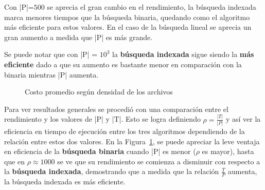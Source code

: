 \documentclass[11pt]{article}
\begin{document}
Con |P|=$500$ se aprecia el gran cambio en el rendimiento, la búsqueda indexada marca menores tiempos que la búsqueda binaria, quedando como el algoritmo más eficiente para estos valores. En el caso de la búsqueda lineal se aprecia un gran aumento a medida que |P| es más grande.

Se puede notar que con |P| = $10^3$ la \textbf{búsqueda indexada} sigue siendo la \textbf{más eficiente} dado a que su aumento es bastante menor en comparación con la binaria mientras |P| aumenta.



\newpage

\begin{figure}[h!]
        \centering
        \caption{Costo promedio según densidad de los archivos}
        \label{fig:densidad}
    \end{figure}
    
Para ver resultados generales se procedió con una comparación entre el rendimiento y los valores de |P| y |T|. Esto se logra definiendo $\rho = \frac{|T|}{|P|}$ y así ver la eficiencia en tiempo de ejecución entre los tres algoritmos dependiendo de la relación entre estos dos valores. En la Figura~\ref{fig:densidad}, se puede apreciar la leve ventaja en eficiencia de la \textbf{búsqueda binaria} cuando |P| es menor ($\rho$ es mayor), hasta que en $\rho \approx 1000$ se ve que su rendimiento se comienza a disminuir con respecto a la \textbf{búsqueda indexada}, demostrando que a medida que la relación $\frac{T}{P}$ aumenta, la búsqueda indexada es más eficiente.
\end{document}
